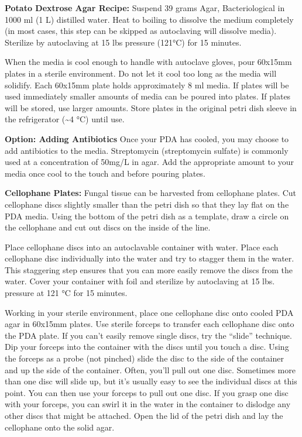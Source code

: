 \documentclass[
  letterpaper,
  DIV=11,
  numbers=noendperiod]{scrreprt}
\begin{document}
\textbf{Potato Dextrose Agar Recipe:} Suspend 39 grams Agar,
Bacteriological in 1000 ml (1 L) distilled water. Heat to boiling to
dissolve the medium completely (in most cases, this step can be skipped
as autoclaving will dissolve media). Sterilize by autoclaving at 15 lbs
pressure (121°C) for 15 minutes.

When the media is cool enough to handle with autoclave gloves, pour
60x15mm plates in a sterile environment. Do not let it cool too long as
the media will solidify. Each 60x15mm plate holds approximately 8 ml
media. If plates will be used immediately smaller amounts of media can
be poured into plates. If plates will be stored, use larger amounts.
Store plates in the original petri dish sleeve in the refrigerator
(\textasciitilde4 °C) until use.

\textbf{Option: Adding Antibiotics} Once your PDA has cooled, you may
choose to add antibiotics to the media. Streptomycin (streptomycin
sulfate) is commonly used at a concentration of 50mg/L in agar. Add the
appropriate amount to your media once cool to the touch and before
pouring plates.

\textbf{Cellophane Plates:} Fungal tissue can be harvested from
cellophane plates. Cut cellophane discs slightly smaller than the petri
dish so that they lay flat on the PDA media. Using the bottom of the
petri dish as a template, draw a circle on the cellophane and cut out
discs on the inside of the line.

Place cellophane discs into an autoclavable container with water. Place
each cellophane disc individually into the water and try to stagger them
in the water. This staggering step ensures that you can more easily
remove the discs from the water. Cover your container with foil and
sterilize by autoclaving at 15 lbs. pressure at 121 °C for 15 minutes.

Working in your sterile environment, place one cellophane disc onto
cooled PDA agar in 60x15mm plates. Use sterile forceps to transfer each
cellophane disc onto the PDA plate. If you can't easily remove single
discs, try the ``slide'' technique. Dip your forceps into the container
with the discs until you touch a disc. Using the forceps as a probe (not
pinched) slide the disc to the side of the container and up the side of
the container. Often, you'll pull out one disc. Sometimes more than one
disc will slide up, but it's usually easy to see the individual discs at
this point. You can then use your forceps to pull out one disc. If you
grasp one disc with your forceps, you can swirl it in the water in the
container to dislodge any other discs that might be attached. Open the
lid of the petri dish and lay the cellophane onto the solid agar.
\end{document}
